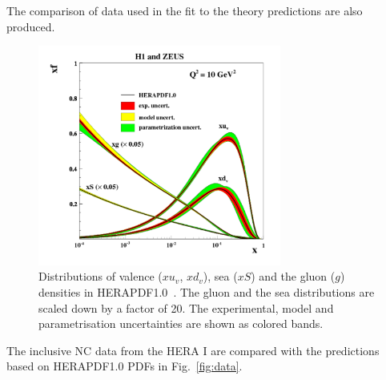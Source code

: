 \begin{description}
The comparison of data used in the fit to the theory predictions are also produced. 
\begin{figure}[!ht]
   \centering
   \includegraphics[width=8cm]{hera1.pdf}
   \caption{Distributions of valence ($xu_v$, $xd_v$), sea ($xS$) and the gluon ($g$) densities in HERAPDF1.0~\cite{h1zeus:2009wt}. 
       The gluon and the sea distributions are scaled down by a factor of 20.
       The experimental, model and parametrisation uncertainties are shown as colored bands.}
 \label{fig:hera1}
\end{figure}
The inclusive NC data from the HERA I are compared with the predictions based on 
HERAPDF1.0 PDFs in Fig.~\ref{fig:data}.


\end{description}
